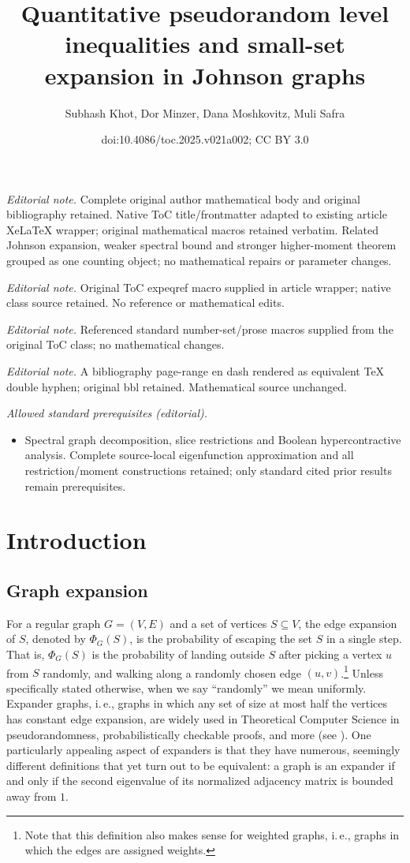 \documentclass[11pt]{article}
\title{Quantitative pseudorandom level inequalities and small-set expansion in Johnson graphs}
\author{Subhash Khot, Dor Minzer, Dana Moshkovitz, Muli Safra}
\date{doi:10.4086/toc.2025.v021a002; CC BY 3.0}
\newcommand{\ie}{i.\,e.}
\begin{document}
\maketitle
\noindent\textit{Editorial note.} Complete original author mathematical body and original bibliography retained. Native ToC title/frontmatter adapted to existing article XeLaTeX wrapper; original mathematical macros retained verbatim. Related Johnson expansion, weaker spectral bound and stronger higher-moment theorem grouped as one counting object; no mathematical repairs or parameter changes.\par\medskip
\noindent\textit{Editorial note.} Original ToC expeqref macro supplied in article wrapper; native class source retained. No reference or mathematical edits.\par\medskip
\noindent\textit{Editorial note.} Referenced standard number-set/prose macros supplied from the original ToC class; no mathematical changes.\par\medskip
\noindent\textit{Editorial note.} A bibliography page-range en dash rendered as equivalent TeX double hyphen; original bbl retained. Mathematical source unchanged.\par\medskip
\noindent\textit{Allowed standard prerequisites (editorial).}\begin{itemize}
\item Spectral graph decomposition, slice restrictions and Boolean hypercontractive analysis. Complete source-local eigenfunction approximation and all restriction/moment constructions retained; only standard cited prior results remain prerequisites.
\end{itemize}\medskip
\section{Introduction}
\subsection{Graph expansion}
For a regular graph $G=(V,E)$ and a set of vertices $S\subseteq V$, the edge expansion of $S$, denoted by
$\Phi_G(S)$, is the probability of escaping the set $S$ in a single step.
%
%
%
That is, $\Phi_G(S)$ is the probability of landing outside $S$
after picking a vertex $u$ from $S$ randomly, and walking along a randomly chosen edge $(u,v)$.\footnote{Note that this definition also makes sense for weighted graphs, \ie, graphs in which the edges are assigned weights.}
Unless specifically stated otherwise, when we say ``randomly'' we mean uniformly. %
Expander graphs, \ie, graphs in which any set of size at most half the vertices has
constant edge expansion, are widely used in Theoretical Computer Science in
pseudorandomness, probabilistically checkable proofs,
and more (see \cite{HLW}). One particularly appealing aspect of
expanders %
is that they have numerous,
seemingly different definitions  %
that yet turn out to be equivalent: a graph is an expander %
if and only if the second eigenvalue of its normalized adjacency
matrix is bounded away from $1$.
\end{document}
